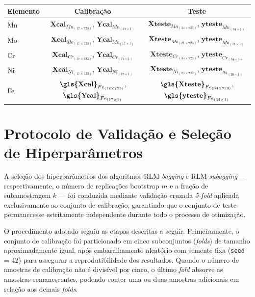 \def\mna{(17 \times 723)}\def\mnb{(17 \times 1)}
\def\mnc{(34 \times 723)}\def\mnd{(21 \times 1)}
\def\mne{(21 \times 723)}\def\mnf{(34 \times 1)}
\def\mng{(20 \times 1)}\def\mnh{(20 \times 1)}
\def\mni{(20 \times 723)}\def\mnj{(17 \times 1)}
\begin{quadro}[ht]
\centering
\caption{Dimensões dos conjuntos de dados para diferentes elementos.}
\begin{tabular}{|l|c|c|}
\hline
\textbf{Elemento} & \textbf{Calibração} & \textbf{Teste} \\
\hline
Mn & $\textbf{Xcal}_{Mn_{\mna}}$, $\textbf{Ycal}_{Mn_{\mnb}}$ & $\textbf{Xteste}_{Mn_{\mnc}}$, $\textbf{yteste}_{Mn_{\mnf}}$ \\
Mo & $\textbf{Xcal}_{Mo_{\mna}}$, $\textbf{Ycal}_{Mo_{\mnb}}$ & $\textbf{Xteste}_{Mo_{\mne}}$, $\textbf{yteste}_{Mo_{\mnd}}$ \\
Cr & $\textbf{Xcal}_{Cr_{\mna}}$, $\textbf{Ycal}_{Cr_{\mnb}}$ & $\textbf{Xteste}_{Cr_{\mnc}}$, $\textbf{yteste}_{Cr_{\mnf}}$ \\
Ni & $\textbf{Xcal}_{Ni_{\mna}}$, $\textbf{Ycal}_{Ni_{\mnb}}$ & $\textbf{Xteste}_{Ni_{\mni}}$, $\textbf{yteste}_{Ni_{\mnh}}$ \\
Fe & $\textbf{\gls{Xcal}}_{Fe_{\mna}}$, $\textbf{\gls{Ycal}}_{Fe_{\mnb}}$ & $\textbf{\gls{Xteste}}_{Fe_{\mnc}}$, $\textbf{\gls{yteste}}_{Fe_{\mnf}}$ \\
\hline
\end{tabular}
\label{tab:conjuntos_subscritos}
\end{quadro}

\section{Protocolo de Validação e Seleção de Hiperparâmetros}
\label{sec:protocolo}

A seleção dos hiperparâmetros dos algoritmos RLM-\textit{bagging} e 
RLM-\textit{subagging} --- respectivamente, o número de replicações 
bootstrap $m$ e a fração de subamostragem $k$ --- foi conduzida 
mediante validação cruzada \textit{5-fold} aplicada exclusivamente 
ao conjunto de calibração, garantindo que o conjunto de teste 
permanecesse estritamente independente durante todo o processo de 
otimização.

O procedimento adotado seguiu as etapas descritas a seguir. 
Primeiramente, o conjunto de calibração foi particionado em cinco 
subconjuntos (\textit{folds}) de tamanho aproximadamente igual, 
após embaralhamento aleatório com semente fixa (\texttt{seed} = 42) 
para assegurar a reprodutibilidade dos resultados. Quando o número 
de amostras de calibração não é divisível por cinco, o último 
\textit{fold} absorve as amostras remanescentes, podendo conter uma 
ou duas amostras adicionais em relação aos demais \textit{folds}.

